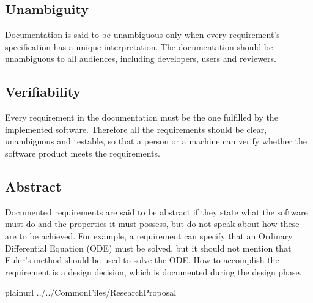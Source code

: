 \documentclass[letterpaper,cleveref]{lipics-v2019}
\begin{document}
\subsection{Unambiguity}

Documentation is said to be unambiguous only when every requirement's
specification has a unique interpretation.  The documentation should be
unambiguous to all audiences, including developers, users and reviewers.

\subsection{Verifiability}

Every requirement in the documentation must be the one fulfilled by the
implemented software. Therefore all the requirements should be clear,
unambiguous and testable, so that a person or a machine can verify whether the
software product meets the requirements.

\subsection{Abstract}

Documented requirements are said to be abstract if they state what the software
must do and the properties it must possess, but do not speak about how these are
to be achieved. For example, a requirement can specify that an Ordinary
Differential Equation (ODE) must be solved, but it should not mention that
Euler's method should be used to solve the ODE. How to accomplish the
requirement is a design decision, which is documented during the design phase.

\newpage

 {plainurl}
 {../../CommonFiles/ResearchProposal}
\end{document}
